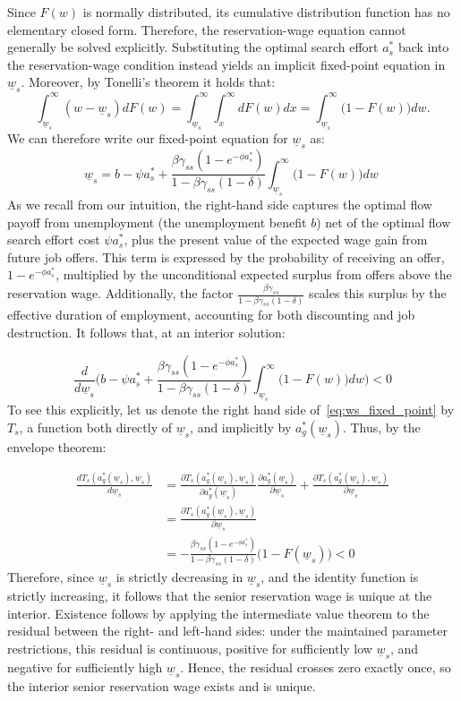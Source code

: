 \documentclass{article}
\newcommand{\lbar}[1]{\underline{#1}} %
\begin{document}
Since $F(w)$ is normally distributed, its cumulative distribution function has no elementary closed form. Therefore, the reservation-wage equation cannot generally be solved explicitly. Substituting the optimal search effort $a_s^*$ back into the reservation-wage condition instead yields an implicit fixed-point equation in $\lbar{w}_s$. Moreover, by Tonelli's theorem it holds that:
\[
\int_{\lbar{w}_s}^{\infty} (w-\lbar{w}_s)dF(w)
= \int_{\lbar{w}_s}^{\infty}\int_x^{\infty} dF(w)dx
= \int_{\lbar{w}_s}^{\infty} \bigl(1-F(w)\bigr)dw.
\]
We can therefore write our fixed-point equation for $\lbar{w}_s$ as:
\begin{equation}
\lbar{w}_s=b-\psi a_s^*+\frac{\beta\gamma_{ss}(1-e^{-\phi a_s^*})}{1-\beta\gamma_{ss}(1-\delta)}\int_{\lbar{w}_s}^{\infty} \bigl(1-F(w)\bigr)dw
~\label{eq:ws_fixed_point}
\end{equation}
As we recall from our intuition, the right-hand side captures the optimal flow payoff from unemployment (the unemployment benefit $b$) net of the optimal flow search effort cost $\psi a_s^*$, plus the present value of the expected wage gain from future job offers. This term is expressed by the probability of receiving an offer, $1-e^{-\phi a_s^*}$, multiplied by the unconditional expected surplus from offers above the reservation wage. Additionally, the factor $\frac{\beta\gamma_{ss}}{1-\beta\gamma_{ss}(1-\delta)}$ scales this surplus by the effective duration of employment, accounting for both discounting and job destruction. It follows that, at an interior solution:

\[
\frac{d}{d\lbar{w}_s}\biggl(b-\psi a_s^*+\frac{\beta\gamma_{ss}(1-e^{-\phi a_s^*})}{1-\beta\gamma_{ss}(1-\delta)}\int_{\lbar{w}_s}^{\infty} \bigl(1-F(w)\bigr)dw\biggr)<0
\]
To see this explicitly, let us denote the right hand side of~\eqref{eq:ws_fixed_point} by $T_s$, a function both directly of $\lbar{w}_s$, and implicitly by $a^*_g(\lbar{w}_s)$. Thus, by the envelope theorem:

\begin{align*}
\frac{dT_s(a^*_g(\lbar{w}_s), \lbar{w}_s)}{d\lbar{w}_s}&=\frac{\partial T_s(a^*_g(\lbar{w}_s), \lbar{w}_s)}{\partial a^*_g(\lbar{w}_s)}\frac{\partial a^*_g(\lbar{w}_s)}{\partial \lbar{w}_s}+\frac{\partial T_s(a^*_g(\lbar{w}_s), \lbar{w}_s)}{\partial \lbar{w}_s}\\
&=\frac{\partial T_s(a^*_g(\lbar{w}_s), \lbar{w}_s)}{\partial \lbar{w}_s}\\
&=-\frac{\beta\gamma_{ss}(1-e^{-\phi a_s^*})}{1-\beta\gamma_{ss}(1-\delta)}\bigl(1-F(\lbar{w}_s)\bigr)<0
\end{align*}
Therefore, since $\lbar{w}_s$ is strictly decreasing in $\lbar{w}_s$, and the identity function is strictly increasing, it follows that the senior reservation wage is unique at the interior. Existence follows by applying the intermediate value theorem to the residual between the right- and left-hand sides: under the maintained parameter restrictions, this residual is continuous, positive for sufficiently low $\lbar{w}_s$, and negative for sufficiently high $\lbar{w}_s$. Hence, the residual crosses zero exactly once, so the interior senior reservation wage exists and is unique. 
\end{document}
